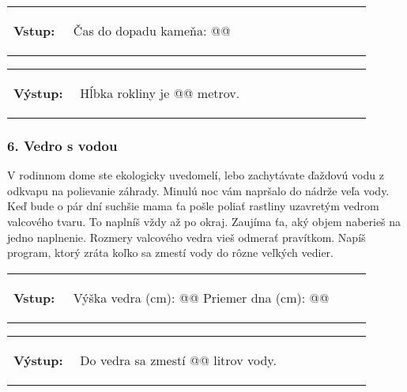 \begin{tabular}{@{}p{0.15\linewidth}p{0.75\linewidth}}
\textbf{\small Vstup:} &
\vspace{-3em}
\begin{code}
Čas do dopadu kameňa: @\fbox{\phantom{vstup}}@
\end{code}
\end{tabular}

\vspace{-2em}
\begin{tabular}{@{}p{0.15\linewidth}p{0.75\linewidth}}
\textbf{\small Výstup:} &
\vspace{-3em}
\begin{code}
Hĺbka rokliny je @\fbox{\phantom{vstup}}@ metrov.
\end{code}
\end{tabular}
\vspace{-2em}

\subsubsection*{6. Vedro s vodou}
V rodinnom dome ste ekologicky uvedomelí, lebo zachytávate ďaždovú vodu z odkvapu na polievanie záhrady. Minulú noc vám napršalo do nádrže veľa vody. Keď bude o pár dní suchšie mama ťa pošle poliať rastliny uzavretým vedrom valcového tvaru. To naplníš vždy až po okraj. Zaujíma ťa, aký objem naberieš na jedno naplnenie. Rozmery valcového vedra vieš odmerať pravítkom. Napíš program, ktorý zráta koľko sa zmestí vody do rôzne veľkých vedier.

\begin{tabular}{@{}p{0.15\linewidth}p{0.75\linewidth}}
\textbf{\small Vstup:} &
\vspace{-3em}
\begin{code}
Výška vedra (cm): @\fbox{\phantom{vstup}}@
Priemer dna (cm): @\fbox{\phantom{vstup}}@
\end{code}
\end{tabular}

\vspace{-2em}
\begin{tabular}{@{}p{0.15\linewidth}p{0.75\linewidth}}
\textbf{\small Výstup:} &
\vspace{-3em}
\begin{code}
Do vedra sa zmestí @\fbox{\phantom{vstup}}@ litrov vody.
\end{code}
\end{tabular}
\vspace{-2em}

